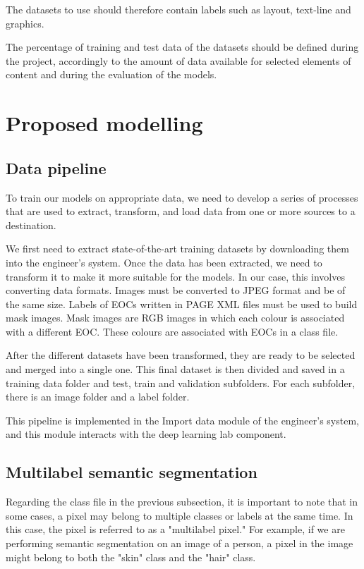 \documentclass{polytech/polytech}
\numberwithin{figure}{chapter}
\begin{document}
The datasets to use should therefore contain labels such as layout, text-line and graphics.

The percentage of training and test data of the datasets should be defined during the project, accordingly to the amount of data available for selected elements of content and during the evaluation of the models.


\section{Proposed modelling}

\subsection{Data pipeline}

To train our models on appropriate data, we need to develop a series of processes that are used to extract, transform, and load data from one or more sources to a destination.

We first need to extract state-of-the-art training datasets by downloading them into the engineer's system.
Once the data has been extracted, we need to transform it to make it more suitable for the models.
In our case, this involves converting data formats.
Images must be converted to JPEG format and be of the same size.
Labels of EOCs written in PAGE XML files must be used to build mask images.
Mask images are RGB images in which each colour is associated with a different EOC.
These colours are associated with EOCs in a class file.

After the different datasets have been transformed, they are ready to be selected and merged into a single one.
This final dataset is then divided and saved in a training data folder and test, train and validation subfolders.
For each subfolder, there is an image folder and a label folder.

This pipeline is implemented in the Import data module of the engineer’s system, and this module interacts with the deep learning lab component.


\subsection{Multilabel semantic segmentation}

Regarding the class file in the previous subsection, it is important to note that in some cases, a pixel may belong to multiple classes or labels at the same time.
In this case, the pixel is referred to as a "multilabel pixel."
For example, if we are performing semantic segmentation on an image of a person, a pixel in the image might belong to both the "skin" class and the "hair" class.
\end{document}

